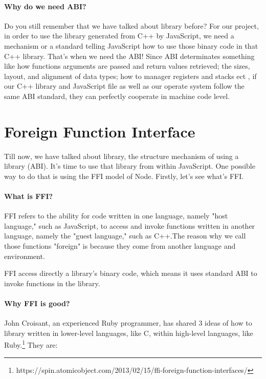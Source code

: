     \paragraph{Why do we need ABI?}
    Do you still remember that we have talked about library before? For our project, in order to use the library generated from C++ by JavaScript, we need a mechanism or a standard telling JavaScript how to use those binary code in that C++ library. That's when we need the ABI! Since ABI determinates something like how functions arguments are passed and return values retrieved; the sizes, layout, and alignment of data types; how to manager registers and stacks ect \cite{ALTERA-14}, if our C++ library and JavaScript file as well as our operate system follow the same ABI standard, they can perfectly cooperate in machine code level.
    
  
\section{Foreign Function Interface}

    Till now, we have talked about library, the structure mechanism of using a library (ABI). It's time to use that library from within JavaScript. One possible way to do that is using the FFI model of Node. Firstly, let's see what's FFI.
    
    \paragraph{What is FFI?} FFI refers to the ability for code written in one language, namely "host language," such as JavaScript, to access and invoke functions written in another language, namely the "guest language," such as C++\cite{Sigbjorn-99}.The reason why we call those functions "foreign" is because they come from another language and environment.\cite{Matthias-Grimmer-14}
    
    FFI access directly a library's binary code, which means it uses standard ABI to invoke functions in the library.
    
    \paragraph{Why FFI is good?} John Croisant, an experienced Ruby programmer, has shared 3 ideas of how to library written in lower-level languages, like C, within high-level languages, like Ruby.\footnote{\label{note1}https://spin.atomicobject.com/2013/02/15/ffi-foreign-function-interfaces/} They are:\newline
   
